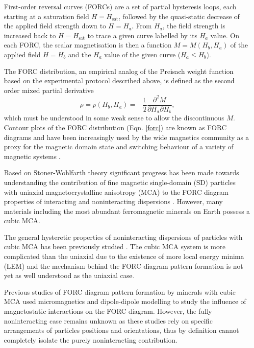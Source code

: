 First-order reversal curves (FORCs) are a set of partial hysteresis loops, each starting at a saturation field $H=H_{\text{sat}}$, followed by the quasi-static decrease of the applied field strength down to $H=H_a$. From $H_a$, the field strength is increased back to $H=H_{\text{sat}}$ to trace a given curve labelled by its $H_a$ value. On each FORC, the scalar magnetisation is then a function $M=M(H_b, H_a)$ of the applied field $H=H_b$ and the $H_a$ value of the given curve ($H_a \leq H_b$).\par
The FORC distribution, an empirical analog of the Preisach weight function based on the experimental protocol described above, is defined as the second order mixed partial derivative \citep{Roberts2000}
\begin{equation}\label{forc}
\rho = \rho(H_b, H_a) = -\frac{1}{2}\frac{\partial^2 M}{\partial H_a \partial H_b},
\end{equation}
which must be understood in some weak sense to allow the discontinuous $M$. Contour plots of the FORC distribution (Eqn. \ref{forc}) are known as FORC diagrams and have been increasingly used by the wide magnetics community as a proxy for the magnetic domain state and switching behaviour of a variety of magnetic systems \citep{Pike1999,Pike2005,Roberts2000,Biasi2016,Proenca2017}.\par

Based on Stoner-Wohlfarth theory \citep{Stoner1948} significant progress has been made towards understanding the contribution of fine magnetic single-domain (SD) particles with uniaxial magnetocrystalline anisotropy (MCA) to the FORC diagram properties of interacting and noninteracting dispersions \citep{Newell2005,Egli2010,Biasi2016}. However, many materials including the most abundant ferromagnetic minerals on Earth possess a cubic MCA.\par

The general hysteretic properties of noninteracting dispersions of particles with cubic MCA has been previously studied \citep{Usov1997,Walker1993}. The cubic MCA system is more complicated than the uniaxial due to the existence of more local energy minima (LEM) and the mechanism behind the FORC diagram pattern formation is not yet as well understood as the uniaxial case.\par

Previous studies of FORC diagram pattern formation by minerals with cubic MCA used micromagnetics \citep{Muxworthy2004} and dipole-dipole modelling \citep{Harrison2014} to study the influence of magnetostatic interactions on the FORC diagram. However, the fully noninteracting case remains unknown as these studies rely on specific arrangements of particles positions and orientations, thus by definition cannot completely isolate the purely noninteracting contribution.\par


